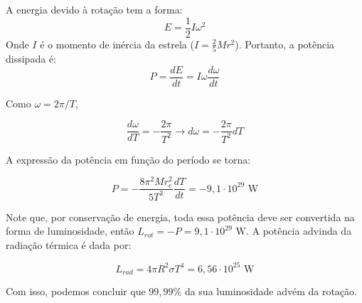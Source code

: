 \documentclass[11pt]{article}
\begin{document}
\begin{pproblem}
\begin{pssolution*}{}{}
\begin{alternativas}
            \item A energia devido à rotação tem a forma:
            \[E = \frac{1}{2}I\omega^2\]
            Onde \(I\) é o momento de inércia da estrela (\(I = \frac{2}{5}Mr^2\)). Portanto, a potência dissipada é:
            \[P = \frac{dE}{dt} = I\omega\frac{d\omega}{dt}\]

            Como \(\omega = 2\pi/T\),

            \[\frac{d\omega}{dT} = -\frac{2\pi}{T^2} \rightarrow d\omega = -\frac{2\pi}{T^2}dT\]
            
            A expressão da potência em função do período se torna:

            \[P = -\frac{8\pi^2Mr_e^2}{5T^3}\frac{dT}{dt} = -9,1\cdot10^{29} \text{ W}\]

            Note que, por conservação de energia, toda essa potência deve ser convertida na forma de luminosidade, então \(L_{rot} = -P = 9,1\cdot10^{29}\text{ W}\). A potência advinda da radiação térmica é dada por:

            \[L_{rad} = 4\pi R^2\sigma T^4 = 6,56 \cdot 10^{25}\text{ W}\]

            Com isso, podemos concluir que \(99,99\%\) da sua luminosidade advém da rotação.
        \end{alternativas}
    \end{pssolution*}    
\end{pproblem}
\end{document}
